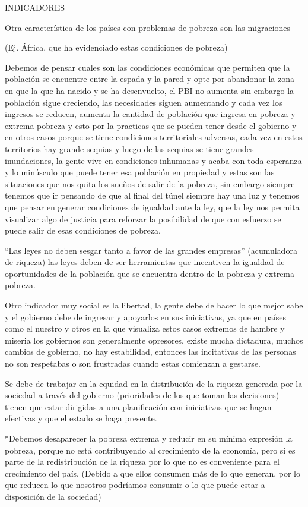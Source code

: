\documentclass[
  a4paper,
]{article}
\begin{document}
INDICADORES

Otra característica de los países con problemas de pobreza son las
migraciones

(Ej. África, que ha evidenciado estas condiciones de pobreza)

Debemos de pensar cuales son las condiciones económicas que permiten que
la población se encuentre entre la espada y la pared y opte por
abandonar la zona en que la que ha nacido y se ha desenvuelto, el PBI no
aumenta sin embargo la población sigue creciendo, las necesidades siguen
aumentando y cada vez los ingresos se reducen, aumenta la cantidad de
población que ingresa en pobreza y extrema pobreza y esto por la
practicas que se pueden tener desde el gobierno y en otros casos porque
se tiene condiciones territoriales adversas, cada vez en estos
territorios hay grande sequias y luego de las sequias se tiene grandes
inundaciones, la gente vive en condiciones inhumanas y acaba con toda
esperanza y lo minúsculo que puede tener esa población en propiedad y
estas son las situaciones que nos quita los sueños de salir de la
pobreza, sin embargo siempre tenemos que ir pensando de que al final del
túnel siempre hay una luz y tenemos que pensar en generar condiciones de
igualdad ante la ley, que la ley nos permita visualizar algo de justicia
para reforzar la posibilidad de que con esfuerzo se puede salir de esas
condiciones de pobreza.

``Las leyes no deben sesgar tanto a favor de las grandes empresas''
(acumuladora de riqueza) las leyes deben de ser herramientas que
incentiven la igualdad de oportunidades de la población que se encuentra
dentro de la pobreza y extrema pobreza.

Otro indicador muy social es la libertad, la gente debe de hacer lo que
mejor sabe y el gobierno debe de ingresar y apoyarlos en sus
iniciativas, ya que en países como el nuestro y otros en la que
visualiza estos casos extremos de hambre y miseria los gobiernos son
generalmente opresores, existe mucha dictadura, muchos cambios de
gobierno, no hay estabilidad, entonces las incitativas de las personas
no son respetabas o son frustradas cuando estas comienzan a gestarse.

Se debe de trabajar en la equidad en la distribución de la riqueza
generada por la sociedad a través del gobierno (prioridades de los que
toman las decisiones) tienen que estar dirigidas a una planificación con
iniciativas que se hagan efectivas y que el estado se haga presente.

*Debemos desaparecer la pobreza extrema y reducir en su mínima expresión
la pobreza, porque no está contribuyendo al crecimiento de la economía,
pero si es parte de la redistribución de la riqueza por lo que no es
conveniente para el crecimiento del país. (Debido a que ellos consumen
más de lo que generan, por lo que reducen lo que nosotros podríamos
consumir o lo que puede estar a disposición de la sociedad)
\end{document}
